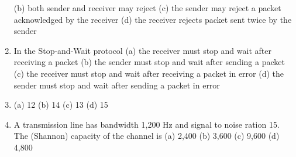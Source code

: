 \documentclass{article}
\begin{document}
\begin{enumerate}
            \newline
            (b) both sender and receiver may reject
            \newline
            (c) the sender may reject a packet acknowledged by the receiver
            \newline
            (d) the receiver rejects packet sent twice by the sender
        \item In the Stop-and-Wait protocol
            \newline
            (a) the receiver must stop and wait after receiving a packet
            \newline
            (b) the sender must stop and wait after sending a packet
            \newline
            (c) the receiver must stop and wait after receiving a packet in error
            \newline
            (d) the sender must stop and wait after sending a packet in error
        \item (a) 12
            \newline
            (b) 14
            \newline
            (c) 13
            \newline
            (d) 15
        \item A transmission line has bandwidth 1,200 Hz and signal to noise ration 15. The (Shannon) capacity of the channel is
            \newline
            (a) 2,400
            \newline
            (b) 3,600
            \newline
            (c) 9,600
            \newline
            (d) 4,800
    \end{enumerate}
\end{document}

